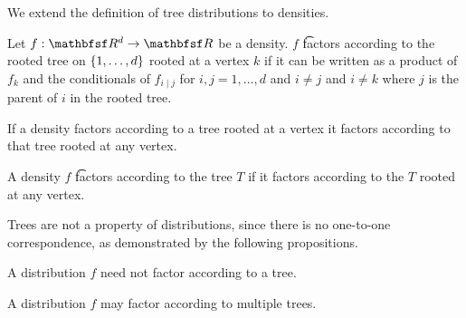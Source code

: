 

We extend the definition of tree distributions to densities.



Let $f: \R^d \to \R$ be a density.  $f$ \t{factors according to the rooted tree}{} on $\{1, \dots, d\}$ rooted at a vertex $k$ if it can be written as a product of $f_k$ and the conditionals of $f_{i \mid j}$ for $i,j = 1, \dots, d$ and $i \neq j$ and $i \neq k$ where $j$ is the parent of $i$ in the rooted tree.


\begin{prop}
If a density factors according
to a tree rooted at a vertex it
factors according to that tree rooted
at any vertex.
\end{prop}


A density $f$
\t{factors according to the tree} $T$
if it factors according to the
$T$ rooted at any vertex.


Trees are not a property of distributions,
since there is no one-to-one correspondence,
as demonstrated by the following propositions.


A distribution $f$ need not factor according to a tree.

A distribution
$f$ may factor according to multiple trees.
